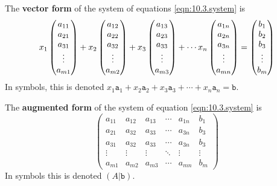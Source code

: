 \begin{definition}
    The {\bf vector form} of the system of equations \eqref{eqn:10.3.system} is
    \[ x_1 \begin{pmatrix} a_{11} \\ a_{21} \\ a_{31} \\ \vdots \\ a_{m1} \end{pmatrix} + 
        x_2 \begin{pmatrix} a_{12} \\ a_{22} \\ a_{32} \\ \vdots \\ a_{m2} \end{pmatrix} +
        x_3 \begin{pmatrix} a_{13} \\ a_{23} \\ a_{33} \\ \vdots \\ a_{m3} \end{pmatrix} + \cdots
        x_n \begin{pmatrix} a_{1n} \\ a_{2n} \\ a_{3n} \\ \vdots \\ a_{mn} \end{pmatrix} =
        \begin{pmatrix} b_1 \\ b_2 \\ b_3 \\ \vdots \\ b_m \end{pmatrix}
        \]
        In symbols, this is denoted $x_1 \texttt{a}_1 + x_2 \texttt{a}_2 + x_3 \texttt{a}_3 + \cdots + x_n
        \texttt{a}_n = \texttt{b}$.
\end{definition}

\begin{definition}
    The {\bf augmented form} of the system of equation \eqref{eqn:10.3.system} is
    \[ \left( \begin{array}{ccccc|c}
            a_{11} & a_{12} & a_{13} & \cdots & a_{1n} & b_1 \\
            a_{21} & a_{32} & a_{33} & \cdots & a_{3n} & b_3 \\
            a_{31} & a_{32} & a_{33} & \cdots & a_{3n} & b_3 \\
            \vdots & \vdots & \vdots & \ddots & \vdots & \vdots \\
            a_{m1} & a_{m2} & a_{m3} & \cdots & a_{mn} & b_m 
        \end{array} \right)
            \]
            In symbols this is denoted $(A | \texttt{b})$.
\end{definition}



